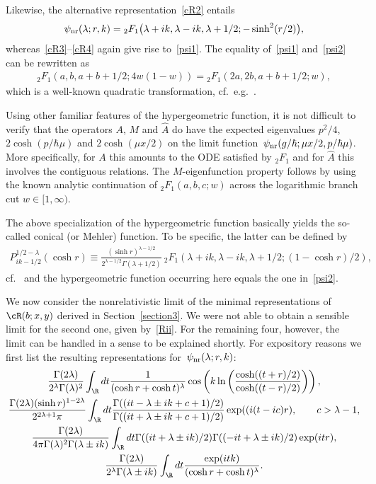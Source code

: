 \documentclass[pdftex]{sigma}
\numberwithin{equation}{section}
\begin{document}
Likewise, the alternative representation~\eqref{cR2} entails
\begin{gather}\label{psi2}
\psi_{\rm nr}(\lambda;r,k)={}_2F_1\big(\lambda+ik,\lambda-ik,\lambda +1/2;-\sinh^2 (r/2)\big),
\end{gather}
whereas~\eqref{cR3}--\eqref{cR4} again give rise to~\eqref{psi1}. The equality of~\eqref{psi1} and~\eqref{psi2} can be rewritten as
\begin{gather}\label{Fq}
{}_2F_1(a,b,a+b+1/2;4w(1-w))={}_2F_1(2a,2b,a+b+1/2;w),
\end{gather}
which is a well-known quadratic transformation, cf.~e.g.~\cite[p.~125]{aar}.

Using other familiar features of the hypergeometric function, it is not dif\/f\/icult to verify that the operators $A$, $M$ and $\hat{A}$ do have the expected eigenvalues $p^2/4$, $2\cosh(p/\hbar\mu)$ and $2\cosh(\mu x/2)$ on the limit function~$\psi_{\rm nr}(g/\hbar;\mu x/2,p/\hbar\mu)$. More specif\/ically, for $A$ this amounts to the ODE satisf\/ied by ${}_2F_1$ and for $\hat{A}$ this involves the contiguous relations. The $M$-eigenfunction property follows by using the known analytic continuation of ${}_2F_1(a,b,c;w)$ across the logarithmic branch cut $w\in[1,\infty)$.

The above specialization of the hypergeometric function  basically yields the so-called conical (or Mehler) function. To be specif\/ic, the latter can be def\/ined by
\begin{gather}\label{conf}
P_{ik-1/2}^{1/2-\lambda}(\cosh r)\equiv \frac{(\sinh r)^{\lambda-1/2}}{2^{\lambda -1/2}\Gamma(\lambda +1/2)}
\ {}_2F_1(\lambda+ik,\lambda-ik,\lambda +1/2;(1-\cosh r)/2),
\end{gather}
cf.~\cite[equation~(14.3.15)]{dlmf} and the hypergeometric function occurring here equals the one in~\eqref{psi2}.

We now consider the nonrelativistic limit of the minimal representations of $\cR(b;x,y)$ derived in Section~\ref{section3}. We were not  able to obtain a sensible limit for the second one, given by~\eqref{Rii}. For the remaining four, however, the limit can be handled in a sense to be explained shortly. For expository reasons we f\/irst list the resulting representations for~$\psi_{\rm nr}(\lambda;r,k)$:
\begin{gather}\label{Rlimi}
\frac{\Gamma(2\lambda)}{2^{\lambda}\Gamma(\lambda)^2}\int_{\R}dt\frac{1}{(\cosh r+\cosh t)^{\lambda}}\cos\left(k\ln \left(\frac{\cosh((t+r)/2)}{\cosh((t-r)/2)}\right)\right),
\\
\label{Rlimiii}
\frac{\Gamma(2\lambda)(\sinh r)^{1-2\lambda}}{2^{2\lambda +1}\pi}
\int_{\R}dt\frac{\Gamma((it-\lambda \pm ik +c+1)/2)}{\Gamma((it+\lambda \pm ik +c+1)/2)}\exp((i(t-ic)r),\qquad c>\lambda -1,
\\
\label{Rlimiv}
\frac{\Gamma(2\lambda)}{4\pi\Gamma(\lambda)^2\Gamma(\lambda \pm ik)}\int_{\R}dt\Gamma((it+\lambda \pm ik)/2)\Gamma((-it+\lambda \pm ik)/2)\exp(itr),
\\
\label{Rlimv}
\frac{\Gamma(2\lambda)}{2^{\lambda}\Gamma(\lambda \pm ik)}\int_{\R}dt\frac{\exp(itk)}{(\cosh r +\cosh t)^{\lambda}}.
\end{gather}
\end{document}
